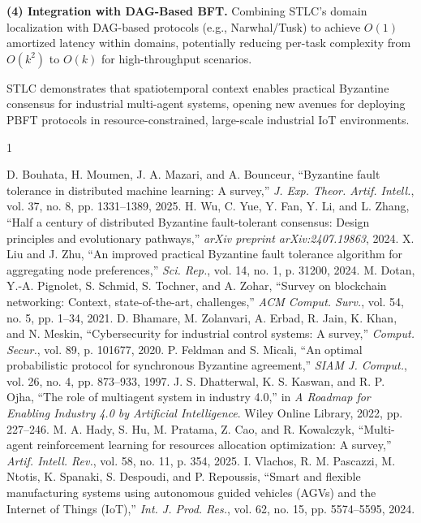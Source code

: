 \documentclass[lettersize,journal]{IEEEtran}
\begin{document}
\textbf{(4) Integration with DAG-Based BFT.} Combining STLC's domain
localization with DAG-based protocols (e.g., Narwhal/Tusk) to achieve
$O(1)$ amortized latency within domains, potentially reducing per-task
complexity from $O(k^2)$ to $O(k)$ for high-throughput scenarios.

STLC demonstrates that spatiotemporal context enables practical Byzantine
consensus for industrial multi-agent systems, opening new avenues for
deploying PBFT protocols in resource-constrained, large-scale industrial
IoT environments.


\begin{thebibliography}{1}


D. Bouhata, H. Moumen, J. A. Mazari, and A. Bounceur, ``Byzantine fault tolerance in distributed machine learning: A survey,'' \textit{J. Exp. Theor. Artif. Intell.}, vol. 37, no. 8, pp. 1331--1389, 2025.
H. Wu, C. Yue, Y. Fan, Y. Li, and L. Zhang, ``Half a century of distributed Byzantine fault-tolerant consensus: Design principles and evolutionary pathways,'' \textit{arXiv preprint arXiv:2407.19863}, 2024.
X. Liu and J. Zhu, ``An improved practical Byzantine fault tolerance algorithm for aggregating node preferences,'' \textit{Sci. Rep.}, vol. 14, no. 1, p. 31200, 2024.
M. Dotan, Y.-A. Pignolet, S. Schmid, S. Tochner, and A. Zohar, ``Survey on blockchain networking: Context, state-of-the-art, challenges,'' \textit{ACM Comput. Surv.}, vol. 54, no. 5, pp. 1--34, 2021.
D. Bhamare, M. Zolanvari, A. Erbad, R. Jain, K. Khan, and N. Meskin, ``Cybersecurity for industrial control systems: A survey,'' \textit{Comput. Secur.}, vol. 89, p. 101677, 2020.
P. Feldman and S. Micali, ``An optimal probabilistic protocol for synchronous Byzantine agreement,'' \textit{SIAM J. Comput.}, vol. 26, no. 4, pp. 873--933, 1997.
J. S. Dhatterwal, K. S. Kaswan, and R. P. Ojha, ``The role of multiagent system in industry 4.0,'' in \textit{A Roadmap for Enabling Industry 4.0 by Artificial Intelligence}. Wiley Online Library, 2022, pp. 227--246.
M. A. Hady, S. Hu, M. Pratama, Z. Cao, and R. Kowalczyk, ``Multi-agent reinforcement learning for resources allocation optimization: A survey,'' \textit{Artif. Intell. Rev.}, vol. 58, no. 11, p. 354, 2025.
I. Vlachos, R. M. Pascazzi, M. Ntotis, K. Spanaki, S. Despoudi, and P. Repoussis, ``Smart and flexible manufacturing systems using autonomous guided vehicles (AGVs) and the Internet of Things (IoT),'' \textit{Int. J. Prod. Res.}, vol. 62, no. 15, pp. 5574--5595, 2024.

\end{thebibliography}
\end{document}
